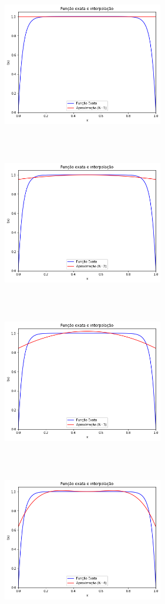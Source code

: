 \documentclass{article}
\begin{document}
\begin{itemize}
\begin{itemize}
\begin{figure}[!htb]
\centering
\includegraphics [width=7cm,height=7cm]{LetraA/Ordem1.png}
\includegraphics [width=7cm,height=7cm]{LetraA/Ordem2.png}
\includegraphics [width=7cm,height=7cm]{LetraA/Ordem3.png}
\includegraphics [width=7cm,height=7cm]{LetraA/Ordem4.png}

\end{figure}
\end{itemize}
\end{itemize}
\end{document}
